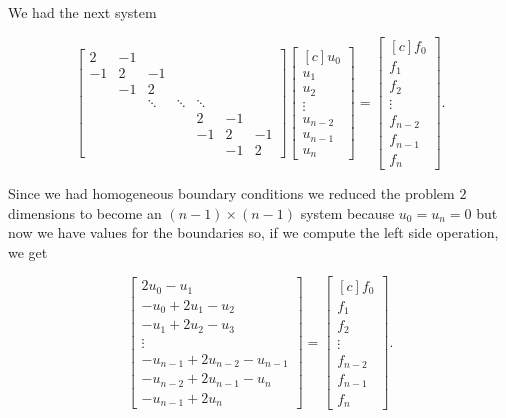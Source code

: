 \documentclass[fontsize=11pt,paper=a4,titlepage]{report}
\begin{document}
We had the next system

\begin{displaymath}
\begin{bmatrix}
	2 & -1 &  &  &  &  &  \\
	-1 & 2 & -1 &  &  &  &  \\
	 & -1 & 2 &  &  &  &  \\
	 &  & \ddots & \ddots & \ddots &  & \\
	 &  &  &  & 2 & -1 &  \\
	 &  &  &  & -1 & 2 & -1 \\
	 &  &  &  &  & -1 & 2
\end{bmatrix}
\begin{bmatrix*}[c]
	u_0 \\
	u_1 \\
	u_2 \\
	\vdots \\
	u_{n - 2} \\
	u_{n - 1} \\
	u_n
\end{bmatrix*}
=
\begin{bmatrix*}[c]
	f_0 \\
	f_1 \\
	f_2 \\
	\vdots \\
	f_{n - 2} \\
	f_{n - 1} \\
	f_n
\end{bmatrix*}.
\end{displaymath}

Since we had homogeneous boundary conditions we reduced the problem $2$ 
dimensions to become an $(n - 1) \times (n - 1)$ system because $u_0 = u_n = 0$ 
but now we have values for the boundaries so, if we compute the left side 
operation, we get

\begin{displaymath}
\begin{bmatrix}
	2u_0 - u_1 \\
	- u_0 + 2u_1 - u_2 \\
	- u_1 + 2u_2 - u_3 \\
	\vdots \\
	- u_{n - 1} + 2u_{n - 2} - u_{n - 1} \\
	- u_{n - 2} + 2u_{n - 1} - u_{n} \\
	- u_{n - 1} + 2u_n
\end{bmatrix}
=
\begin{bmatrix*}[c]
	f_0 \\
	f_1 \\
	f_2 \\
	\vdots \\
	f_{n - 2} \\
	f_{n - 1} \\
	f_n
\end{bmatrix*}.
\end{displaymath}
\end{document}
